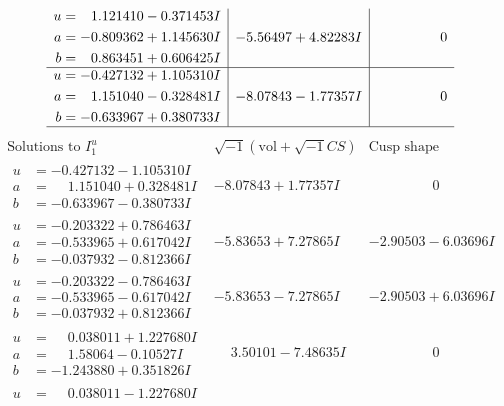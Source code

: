 \documentclass[1p]{elsarticle_modified}
\theoremstyle{definition}
\newcommand{\I}{\sqrt{-1}}
\begin{document}
$$\begin{array}{c|c|c}
\begin{aligned}
u &= \phantom{-}1.121410 - 0.371453 I \\
a &= -0.809362 + 1.145630 I \\
b &= \phantom{-}0.863451 + 0.606425 I\end{aligned}
 & -5.56497 + 4.82283 I & \phantom{-0.000000 } 0 \\ \hline\begin{aligned}
u &= -0.427132 + 1.105310 I \\
a &= \phantom{-}1.151040 - 0.328481 I \\
b &= -0.633967 + 0.380733 I\end{aligned}
 & -8.07843 - 1.77357 I & \phantom{-0.000000 } 0\\
 \hline 
 \end{array}$$\newpage$$\begin{array}{c|c|c}  
\text{Solutions to }I^u_{1}& \I (\text{vol} + \sqrt{-1}CS) & \text{Cusp shape}\\
 \hline 
\begin{aligned}
u &= -0.427132 - 1.105310 I \\
a &= \phantom{-}1.151040 + 0.328481 I \\
b &= -0.633967 - 0.380733 I\end{aligned}
 & -8.07843 + 1.77357 I & \phantom{-0.000000 } 0 \\ \hline\begin{aligned}
u &= -0.203322 + 0.786463 I \\
a &= -0.533965 + 0.617042 I \\
b &= -0.037932 - 0.812366 I\end{aligned}
 & -5.83653 + 7.27865 I & -2.90503 - 6.03696 I \\ \hline\begin{aligned}
u &= -0.203322 - 0.786463 I \\
a &= -0.533965 - 0.617042 I \\
b &= -0.037932 + 0.812366 I\end{aligned}
 & -5.83653 - 7.27865 I & -2.90503 + 6.03696 I \\ \hline\begin{aligned}
u &= \phantom{-}0.038011 + 1.227680 I \\
a &= \phantom{-}1.58064 - 0.10527 I \\
b &= -1.243880 + 0.351826 I\end{aligned}
 & \phantom{-}3.50101 - 7.48635 I & \phantom{-0.000000 } 0 \\ \hline\begin{aligned}
u &= \phantom{-}0.038011 - 1.227680 I \\

\end{aligned}
\end{array}$$
\end{document}
